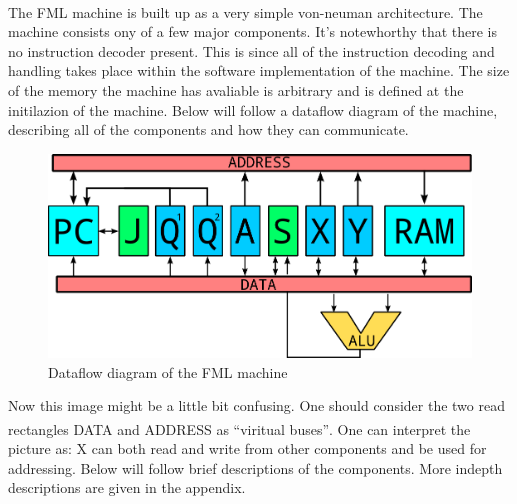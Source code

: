 \documentclass{article}
\begin{document}
The FML machine is built up as a very simple von-neuman
architecture\textsuperscript{\cite{neuman}}. The machine consists ony of a few
major components. It's notewhorthy that there is no instruction decoder present. 
This is since all of the instruction decoding
and handling takes place within the software implementation of the machine.
The size of the memory the machine has avaliable is arbitrary and is defined at
the initilazion of the machine. Below will follow a dataflow diagram of the
machine, describing all of the components and how they can communicate.  

\begin{figure}[H]
\includegraphics[width=\textwidth,height=\textheight,keepaspectratio]{Dataflow.png}
\caption{Dataflow diagram of the FML machine}
\end{figure}       

Now this image might be a little bit confusing. One should consider the two read
rectangles DATA and ADDRESS as ``viritual buses''\textsuperscript{\cite{bus}}.
One can interpret the picture as: X can both read and write from other components and be used for addressing.
Below will follow brief descriptions of the components. More indepth
descriptions are given in the appendix.
\end{document}
